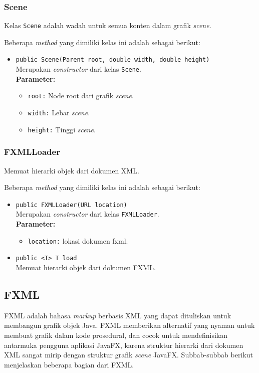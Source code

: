 \subsubsection{Scene}
Kelas \texttt{Scene} adalah wadah untuk semua konten dalam grafik \textit{scene}. 

Beberapa \textit{method} yang dimiliki kelas ini adalah sebagai berikut:
\begin{itemize}
	\item \texttt{public Scene(Parent root, double width, double height)}\\
    Merupakan \textit{constructor} dari kelas \texttt{Scene}.\\
    \textbf{Parameter:}
	\begin{itemize}
		\item \texttt{root:} Node root dari grafik \textit{scene}.
		\item \texttt{width:} Lebar \textit{scene}.
		\item \texttt{height:} Tinggi \textit{scene}.
	\end{itemize}
\end{itemize}


\subsubsection{FXMLLoader}
Memuat hierarki objek dari dokumen XML.

Beberapa \textit{method} yang dimiliki kelas ini adalah sebagai berikut:
\begin{itemize}
	\item \texttt{public FXMLLoader(URL location)}\\
    Merupakan \textit{constructor} dari kelas \texttt{FXMLLoader}.\\
	\textbf{Parameter:}
	\begin{itemize}
		\item \texttt{location:} lokasi dokumen fxml.
	\end{itemize}
	
	\item \texttt{public <T> T load}\\
	Memuat hierarki objek dari dokumen FXML.
\end{itemize}

\subsection{FXML}
\label{fxml}
FXML adalah bahasa \textit{markup} berbasis XML yang dapat dituliskan untuk membangun grafik objek Java. FXML memberikan alternatif yang nyaman untuk membuat grafik dalam kode prosedural, dan cocok untuk mendefinisikan antarmuka pengguna aplikasi JavaFX, karena struktur hierarki dari dokumen XML sangat mirip dengan struktur grafik \textit{scene} JavaFX. \cite{javafx} Subbab-subbab berikut menjelaskan beberapa bagian dari FXML.


